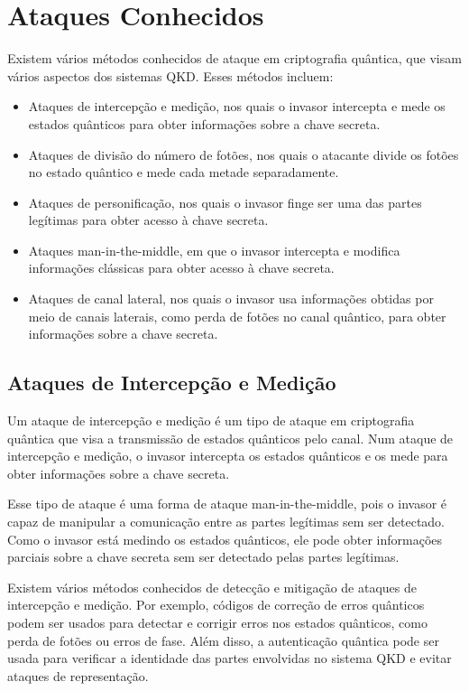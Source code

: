 \section{Ataques Conhecidos}

Existem vários métodos conhecidos de ataque em criptografia quântica, que visam vários aspectos dos sistemas QKD. Esses métodos incluem:

\begin{itemize}
  \item Ataques de intercepção e medição, nos quais o invasor intercepta e mede os estados quânticos para obter informações sobre a chave secreta.
  \item Ataques de divisão do número de fotões, nos quais o atacante divide os fotões no estado quântico e mede cada metade separadamente.
  \item Ataques de personificação, nos quais o invasor finge ser uma das partes legítimas para obter acesso à chave secreta.
  \item Ataques man-in-the-middle, em que o invasor intercepta e modifica informações clássicas para obter acesso à chave secreta.
  \item Ataques de canal lateral, nos quais o invasor usa informações obtidas por meio de canais laterais, como perda de fotões no canal quântico, para obter informações sobre a chave secreta.
\end{itemize}

\subsection{Ataques de Intercepção e Medição}

Um ataque de intercepção e medição é um tipo de ataque em criptografia quântica que visa a transmissão de estados quânticos pelo canal. Num ataque de intercepção e medição, o invasor intercepta os estados quânticos e os mede para obter informações sobre a chave secreta.

Esse tipo de ataque é uma forma de ataque man-in-the-middle, pois o invasor é capaz de manipular a comunicação entre as partes legítimas sem ser detectado. Como o invasor está medindo os estados quânticos, ele pode obter informações parciais sobre a chave secreta sem ser detectado pelas partes legítimas.

Existem vários métodos conhecidos de detecção e mitigação de ataques de intercepção e medição. Por exemplo, códigos de correção de erros quânticos podem ser usados para detectar e corrigir erros nos estados quânticos, como perda de fotões ou erros de fase. Além disso, a autenticação quântica pode ser usada para verificar a identidade das partes envolvidas no sistema QKD e evitar ataques de representação.

